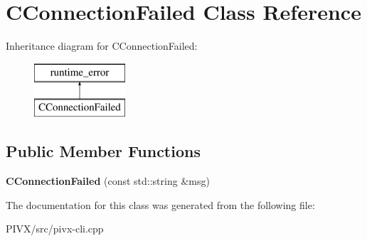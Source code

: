 \hypertarget{class_c_connection_failed}{}\section{C\+Connection\+Failed Class Reference}
\label{class_c_connection_failed}
Inheritance diagram for C\+Connection\+Failed\+:\begin{figure}[H]
\begin{center}
\leavevmode
\includegraphics[height=2.000000cm]{class_c_connection_failed}
\end{center}
\end{figure}
\subsection*{Public Member Functions}
\begin{DoxyCompactItemize}
\item 
\mbox{\label{class_c_connection_failed_abcc9db4386ec901f5159c44d939c82c5}} 
{\bfseries C\+Connection\+Failed} (const std\+::string \&msg)
\end{DoxyCompactItemize}


The documentation for this class was generated from the following file\+:\begin{DoxyCompactItemize}
\item 
P\+I\+V\+X/src/pivx-\/cli.\+cpp\end{DoxyCompactItemize}
